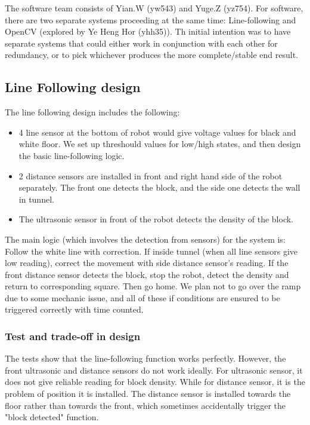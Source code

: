 \documentclass{article}
\begin{document}
\quad The software team consists of Yian.W (yw543) and Yuge.Z (yz754). For software, there are two separate systems proceeding at the same time: Line-following and OpenCV (explored by Ye Heng Hor (yhh35)). Th initial intention was to have separate systems that could either work in conjunction with each other for redundancy, or to pick whichever produces the more complete/stable end result.
\subsection{Line Following design}
The line following design includes the following:
\begin{itemize}
    \item 4 line sensor at the bottom of robot would give voltage values for black and white floor. We set up threshould values for low/high states, and then design the basic line-following logic.
    \item 2 distance sensors are installed in front and right hand side of the robot separately. The front one detects the block, and the side one detects the wall in tunnel.
    \item The ultrasonic sensor in front of the robot detects the density of the block.
\end{itemize}

The main logic (which involves the detection from sensors) for the system is: Follow the white line with correction. If inside tunnel (when all line sensors give low reading), correct the movement with side distance sensor's reading.
If the front distance sensor detects the block, stop the robot, detect the density and return to corresponding square. Then go home. We plan not to go over the ramp due to some mechanic issue, and all of these if conditions are ensured to be triggered correctly with time counted.

\subsubsection{Test and trade-off in design}
The tests show that the line-following function works perfectly. However, the front ultrasonic and distance sensors do not work ideally. For ultrasonic sensor, it does not give reliable reading for block density. While for distance sensor, it is the problem of position it is installed.
The distance sensor is installed towards the floor rather than towards the front, which sometimes accidentally trigger the "block detected" function.
\end{document}
